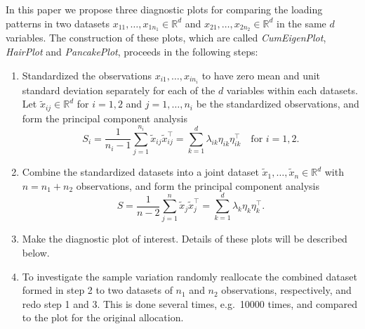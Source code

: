 \documentclass[titlepage,11pt,twoside]{article}
\newcommand{\RR}{\mathbb{R}}
\begin{document}

In this paper we propose three diagnostic plots for comparing the loading patterns in two datasets $x_{11},\dotsc,x_{1 n_1} \in \RR^d$ and $x_{21},\dotsc,x_{2 n_2} \in \RR^d$ in the same $d$ variables. The construction of these plots, which are called \emph{CumEigenPlot}, \emph{HairPlot} and \emph{PancakePlot}, proceeds in the following steps:
\begin{enumerate}
\item Standardized the observations $x_{i1},\dotsc,x_{i n_i}$ to have zero mean and unit standard deviation separately for each of the $d$ variables within each datasets. Let $\tilde{x}_{ij} \in \RR^d$ for $i=1,2$ and $j=1,\dotsc,n_i$ be the standardized observations, and form the principal component analysis
\begin{equation*}
S_i = \frac{1}{n_i-1} \sum_{j=1}^{n_i} \tilde{x}_{ij} \tilde{x}_{ij}^\top = \sum_{k=1}^d \lambda_{ik} \eta_{ik} \eta_{ik}^\top \quad \text{for $i=1,2$.} 
\end{equation*}
\item Combine the standardized datasets into a joint dataset $\tilde{x}_1,\dotsc,\tilde{x}_n \in \RR^d$ with $n=n_1+n_2$ observations, and form the principal component analysis
\begin{equation*}
S = \frac{1}{n-2} \sum_{j=1}^n \tilde{x}_j \tilde{x}_j^\top = \sum_{k=1}^d \lambda_k \eta_k \eta_k^\top.
\end{equation*}
\item Make the diagnostic plot of interest. Details of these plots will be described below.
\item To investigate the sample variation randomly reallocate the combined dataset formed in step 2 to two datasets of $n_1$ and $n_2$ observations, respectively, and redo step 1 and 3. This is done several times, e.g.\ 10000 times, and compared to the plot for the original allocation.
\end{enumerate} 
\end{document}

